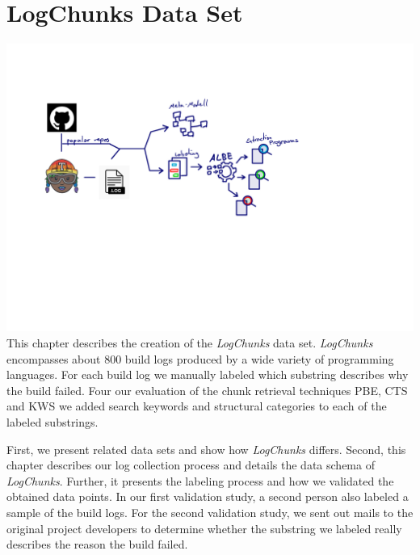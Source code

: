 \documentclass[\myrootdir/main.tex]{subfiles}
\begin{document}
\chapter{LogChunks Data Set}
\label{sec:data-set}
\includegraphics[page=5, width=\textwidth, trim={0.5cm 0.5cm 0.5cm 0.5cm}, clip]{img/flow-of-research.pdf}
This chapter describes the creation of the \emph{LogChunks} data set.
\emph{LogChunks} encompasses about 800 build logs produced by a wide variety of programming languages.
For each build log we manually labeled which substring describes why the build failed.
Four our evaluation of the chunk retrieval techniques PBE, CTS and KWS we added search keywords and structural categories to each of the labeled substrings.

First, we present related data sets and show how \emph{LogChunks} differs.
Second, this chapter describes our log collection process and details the data schema of \emph{LogChunks}.
Further, it presents the labeling process and how we validated the obtained data points.
In our first validation study, a second person also labeled a sample of the build logs.
For the second validation study, we sent out mails to the original project developers to determine whether the substring we labeled really describes the reason the build failed.
\end{document}
